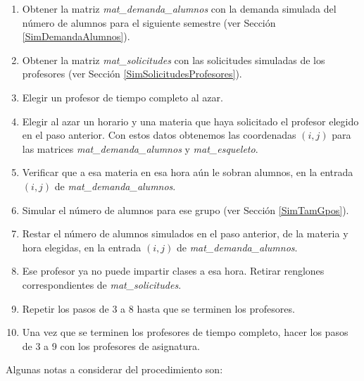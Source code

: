 \begin{enumerate}
\item Obtener la matriz \textit{mat\_demanda\_alumnos} con la demanda simulada del número de alumnos para el siguiente semestre (ver Sección \ref{SimDemandaAlumnos}).

\item Obtener la matriz \textit{mat\_solicitudes} con las solicitudes simuladas de los profesores (ver Sección \ref{SimSolicitudesProfesores}).

\item Elegir un profesor de tiempo completo al azar.

\item Elegir al azar un horario y una materia que haya solicitado el profesor elegido en el paso anterior. Con estos datos obtenemos las coordenadas $(i,j)$ para las matrices \textit{mat\_demanda\_alumnos} y \textit{mat\_esqueleto}.

\item Verificar que a esa materia en esa hora aún le sobran alumnos, en la entrada $(i,j)$ de \textit{mat\_demanda\_alumnos}.

\item Simular el número de alumnos para ese grupo (ver Sección \ref{SimTamGpos}).

\item Restar el número de alumnos simulados en el paso anterior, de la materia y hora elegidas, en la entrada $(i,j)$ de \textit{mat\_demanda\_alumnos}.

\item Ese profesor ya no puede impartir clases a esa hora. Retirar renglones correspondientes de \textit{mat\_solicitudes}.

\item Repetir los pasos de 3 a 8 hasta que se terminen los profesores.

\item Una vez que se terminen los profesores de tiempo completo, hacer los pasos de 3 a 9 con los profesores de asignatura.
\end{enumerate}

Algunas notas a considerar del procedimiento son:

